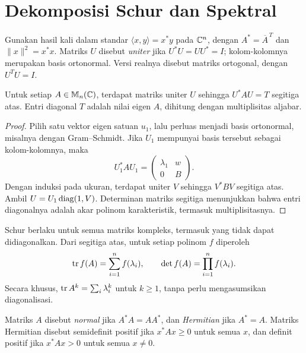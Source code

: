 \section{Dekomposisi Schur dan Spektral}
\label{eigen:spektral}

Gunakan hasil kali dalam standar $\langle x,y\rangle=x^*y$ pada
$\mathbb{C}^n$, dengan $A^*=\overline A^{\,T}$ dan $\|x\|^2=x^*x$.
Matriks $U$ disebut \emph{uniter} jika $U^*U=UU^*=I$;
kolom-kolomnya merupakan basis ortonormal.
Versi realnya disebut matriks ortogonal, dengan $U^TU=I$.

\begin{teorema}
    Untuk setiap $A\in\mathbb{M}_n(\mathbb{C})$, terdapat matriks uniter $U$
    sehingga $U^*AU=T$ segitiga atas. Entri diagonal $T$ adalah
    nilai eigen $A$, dihitung dengan multiplisitas aljabar.
\end{teorema}
\begin{proof}
    Pilih satu vektor eigen satuan $u_1$, lalu perluas menjadi basis
    ortonormal, misalnya dengan Gram--Schmidt. Jika $U_1$ mempunyai
    basis tersebut sebagai kolom-kolomnya, maka
    \[
        U_1^*AU_1=\begin{pmatrix}\lambda_1&w\\0&B\end{pmatrix}.
    \]
    Dengan induksi pada ukuran, terdapat uniter $V$ sehingga
    $V^*BV$ segitiga atas. Ambil $U=U_1\operatorname{diag}(1,V)$.
    Determinan matriks segitiga menunjukkan bahwa entri diagonalnya
    adalah akar polinom karakteristik, termasuk multiplisitasnya.
\end{proof}

Schur berlaku untuk semua matriks kompleks, termasuk yang tidak dapat
didiagonalkan. Dari segitiga atas, untuk setiap polinom $f$ diperoleh
\[
    \operatorname{tr} f(A)=\sum_{i=1}^n f(\lambda_i),\qquad
    \det f(A)=\prod_{i=1}^n f(\lambda_i).
\]
Secara khusus, $\operatorname{tr} A^k=\sum_i\lambda_i^k$ untuk $k\ge1$,
tanpa perlu mengasumsikan diagonalisasi.

\begin{definisi}
    Matriks $A$ disebut \emph{normal} jika $A^*A=AA^*$,
    dan \emph{Hermitian} jika $A^*=A$.
    Matriks Hermitian disebut semidefinit positif jika $x^*Ax\ge0$
    untuk semua $x$, dan definit positif jika $x^*Ax>0$ untuk semua $x\ne0$.
\end{definisi}

